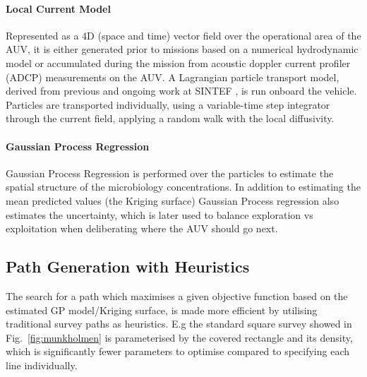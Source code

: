 \documentclass[conference]{IEEEtran}
\newcommand{\cmt}[1]{{\color{red}{#1}}}
\begin{document}
\paragraph{Local Current Model}
Represented as a 4D (space and time) vector field over the operational
area of the AUV, it is either generated prior to missions based on a
numerical hydrodynamic model
or accumulated during the mission from acoustic doppler current
profiler (ADCP) measurements on the AUV.  A Lagrangian particle
transport model, derived from previous and ongoing work at SINTEF
\cite{Rye2006}, is run onboard the vehicle.  Particles are transported
individually, using a variable-time step
integrator %
through the current field, applying a random walk with the local
diffusivity.

\paragraph{Gaussian Process Regression} 
Gaussian Process Regression is performed over the particles to estimate the spatial structure of the microbiology concentrations.
In addition to estimating the mean predicted values (the Kriging surface)
Gaussian Process regression also estimates the uncertainty, which is
later used to balance exploration vs exploitation when deliberating
where the AUV should go next.

\subsection{Path Generation with Heuristics}
The search for a path which maximises a given objective function based on the estimated GP model/Kriging surface, is made more efficient by utilising traditional survey paths as heuristics. E.g the standard square survey showed in
Fig.~\ref{fig:munkholmen} is parameterised by the covered rectangle
and its density, which is significantly fewer parameters to optimise
compared to specifying each line individually.
\end{document}
